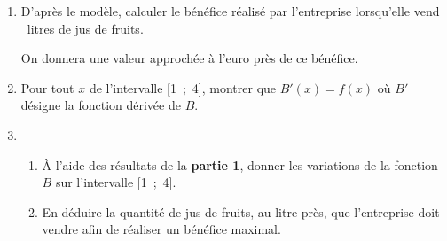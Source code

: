 \begin{enumerate}
\item D'après le modèle, calculer le bénéfice réalisé par l'entreprise lorsqu'elle vend ~litres de jus de fruits.

On donnera une valeur approchée à l'euro près de ce bénéfice.
\item Pour tout $x$ de l'intervalle [1~;~4], montrer que $B'(x) = f(x)$ où $B'$ désigne la fonction dérivée de $B$.
\item 
	\begin{enumerate}
		\item À l'aide des résultats de la \textbf{partie 1}, donner les variations de la fonction $B$ sur l'intervalle [1~;~4].
		\item En déduire la quantité de jus de fruits, au litre près, que l'entreprise doit vendre afin de réaliser un bénéfice maximal.
	\end{enumerate}
\end{enumerate}
